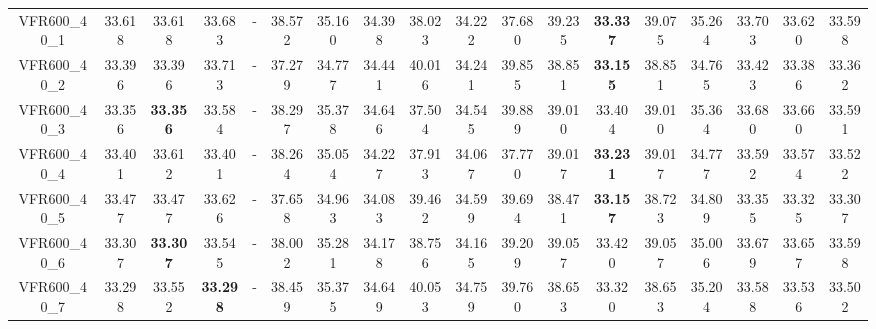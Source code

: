 \begin{tabular}{cc|ccc|ccccccccccccc}
VFR600\_40\_1      & 33.618           & 33.618           & 33.683           & -                & 38.572           & 35.160           & 34.398           & 38.023           & 34.222           & 37.680           & 39.235           & {\bf 33.337}     & 39.075           & 35.264           & 33.703           & 33.620           & 33.598          \\ 
VFR600\_40\_2      & 33.396           & 33.396           & 33.713           & -                & 37.279           & 34.777           & 34.441           & 40.016           & 34.241           & 39.855           & 38.851           & {\bf 33.155}     & 38.851           & 34.765           & 33.423           & 33.386           & 33.362          \\ 
VFR600\_40\_3      & 33.356           & {\bf 33.356}     & 33.584           & -                & 38.297           & 35.378           & 34.646           & 37.504           & 34.545           & 39.889           & 39.010           & 33.404           & 39.010           & 35.364           & 33.680           & 33.660           & 33.591          \\ 
VFR600\_40\_4      & 33.401           & 33.612           & 33.401           & -                & 38.264           & 35.054           & 34.227           & 37.913           & 34.067           & 37.770           & 39.017           & {\bf 33.231}     & 39.017           & 34.777           & 33.592           & 33.574           & 33.522          \\ 
VFR600\_40\_5      & 33.477           & 33.477           & 33.626           & -                & 37.658           & 34.963           & 34.083           & 39.462           & 34.599           & 39.694           & 38.471           & {\bf 33.157}     & 38.723           & 34.809           & 33.355           & 33.325           & 33.307          \\ 
VFR600\_40\_6      & 33.307           & {\bf 33.307}     & 33.545           & -                & 38.002           & 35.281           & 34.178           & 38.756           & 34.165           & 39.209           & 39.057           & 33.420           & 39.057           & 35.006           & 33.679           & 33.657           & 33.598          \\ 
VFR600\_40\_7      & 33.298           & 33.552           & {\bf 33.298}     & -                & 38.459           & 35.375           & 34.649           & 40.053           & 34.759           & 39.760           & 38.653           & 33.320           & 38.653           & 35.204           & 33.588           & 33.536           & 33.502          \\ 

\end{tabular}
